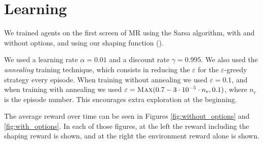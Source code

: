 %
%
%
%
%
%
%
%
%
%
%
%
%
%
%
%
%

\section{Learning}
We trained agents on the first screen of \acl{MR} using the Sarsa algorithm,
with and without options, and using our shaping function
().

We used a learning rate $\alpha=0.01$ and a discount rate $\gamma=0.995$. We
also used the \emph{annealing} training technique, which consists in reducing
the $\varepsilon$ for the $\varepsilon$-greedy strategy every episode. When
training without annealing we used $\varepsilon=0.1$, and when training with
annealing we used $\varepsilon=\textsc{Max}(0.7 - 3\cdot 10^{-5} \cdot n_e,
0.1)$, where $n_e$ is the episode number. This encourages extra exploration at
the beginning.

The average reward over time can be seen in Figures \ref{fig:without_options} and
\ref{fig:with_options}. In each of those figures, at the left the reward
including the shaping reward is shown, and at the right the environment reward
alone is shown.

\newcommand{\drawtraining}[2]{
\begin{figure}[p]
\begin{center}
\texttt{[image: img/sarsa/\#1.pdf]}
\end{center}
\caption{#2\label{fig:#1}}
\end{figure}
}

